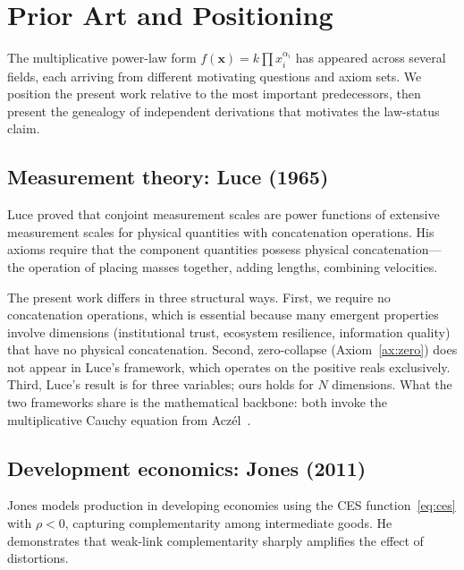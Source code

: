 \documentclass[12pt, a4paper]{article}
\theoremstyle{definition}
\theoremstyle{remark}
\begin{document}
\section{Prior Art and Positioning}\label{sec:priorart}

The multiplicative power-law form $f(\mathbf{x}) = k \prod x_i^{\alpha_i}$ has appeared across several fields, each arriving from different motivating questions and axiom sets. We position the present work relative to the most important predecessors, then present the genealogy of independent derivations that motivates the law-status claim.

\subsection{Measurement theory: Luce (1965)}

Luce \cite{luce1965} proved that conjoint measurement scales are power functions of extensive measurement scales for physical quantities with concatenation operations. His axioms require that the component quantities possess physical concatenation---the operation of placing masses together, adding lengths, combining velocities.

The present work differs in three structural ways. First, we require no concatenation operations, which is essential because many emergent properties involve dimensions (institutional trust, ecosystem resilience, information quality) that have no physical concatenation. Second, zero-collapse (Axiom~\ref{ax:zero}) does not appear in Luce's framework, which operates on the positive reals exclusively. Third, Luce's result is for three variables; ours holds for $N$ dimensions. What the two frameworks share is the mathematical backbone: both invoke the multiplicative Cauchy equation from Acz\'el~\cite{aczel1966}.

\subsection{Development economics: Jones (2011)}

Jones \cite{jones2011} models production in developing economies using the CES function~\eqref{eq:ces} with $\rho < 0$, capturing complementarity among intermediate goods. He demonstrates that weak-link complementarity sharply amplifies the effect of distortions.
\end{document}
